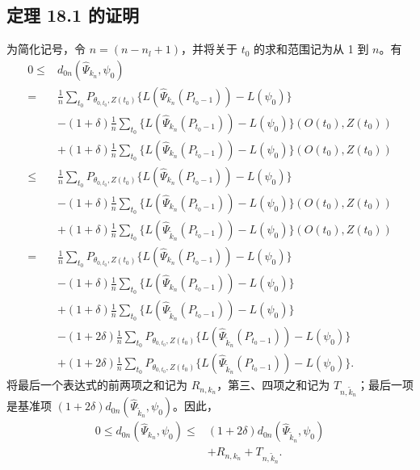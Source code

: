 
\subsection{定理 18.1 的证明}

为简化记号，令 $n=(n-n_l+1)$，并将关于 $t_0$ 的求和范围记为从 1 到 $n$。有
\begin{align*}
0\le{}&d_{0n}(\widehat\Psi_{k_n},\psi_0)\\
={}&\frac1n\sum_{t_0}P_{\theta_{0,t_0},Z(t_0)}
 \{L(\widehat\Psi_{k_n}(P_{t_0-1}))-L(\psi_0)\}\\
&-(1+\delta)\frac1n\sum_{t_0}
 \{L(\widehat\Psi_{k_n}(P_{t_0-1}))-L(\psi_0)\}(O(t_0),Z(t_0))\\
&+(1+\delta)\frac1n\sum_{t_0}
 \{L(\widehat\Psi_{k_n}(P_{t_0-1}))-L(\psi_0)\}(O(t_0),Z(t_0))\\
\le{}&\frac1n\sum_{t_0}P_{\theta_{0,t_0},Z(t_0)}
 \{L(\widehat\Psi_{k_n}(P_{t_0-1}))-L(\psi_0)\}\\
&-(1+\delta)\frac1n\sum_{t_0}
 \{L(\widehat\Psi_{k_n}(P_{t_0-1}))-L(\psi_0)\}(O(t_0),Z(t_0))\\
&+(1+\delta)\frac1n\sum_{t_0}
 \{L(\widehat\Psi_{\widetilde k_n}(P_{t_0-1}))-L(\psi_0)\}(O(t_0),Z(t_0))\\
={}&\frac1n\sum_{t_0}P_{\theta_{0,t_0},Z(t_0)}
 \{L(\widehat\Psi_{k_n}(P_{t_0-1}))-L(\psi_0)\}\\
&-(1+\delta)\frac1n\sum_{t_0}
 \{L(\widehat\Psi_{k_n}(P_{t_0-1}))-L(\psi_0)\}\\
&+(1+\delta)\frac1n\sum_{t_0}
 \{L(\widehat\Psi_{\widetilde k_n}(P_{t_0-1}))-L(\psi_0)\}\\
&-(1+2\delta)\frac1n\sum_{t_0}P_{\theta_{0,t_0},Z(t_0)}
 \{L(\widehat\Psi_{\widetilde k_n}(P_{t_0-1}))-L(\psi_0)\}\\
&+(1+2\delta)\frac1n\sum_{t_0}P_{\theta_{0,t_0},Z(t_0)}
 \{L(\widehat\Psi_{\widetilde k_n}(P_{t_0-1}))-L(\psi_0)\}.
\end{align*}
将最后一个表达式的前两项之和记为 $R_{n,k_n}$，第三、四项之和记为 $T_{n,\widetilde k_n}$；最后一项是基准项 $(1+2\delta)d_{0n}(\widehat\Psi_{\widetilde k_n},\psi_0)$。因此，
\begin{equation}
\begin{aligned}
0\le d_{0n}(\widehat\Psi_{k_n},\psi_0)
\le{}&(1+2\delta)d_{0n}(\widehat\Psi_{\widetilde k_n},\psi_0)\\
&+R_{n,k_n}+T_{n,\widetilde k_n}.
\end{aligned}
\tag{A.7}
\end{equation}


